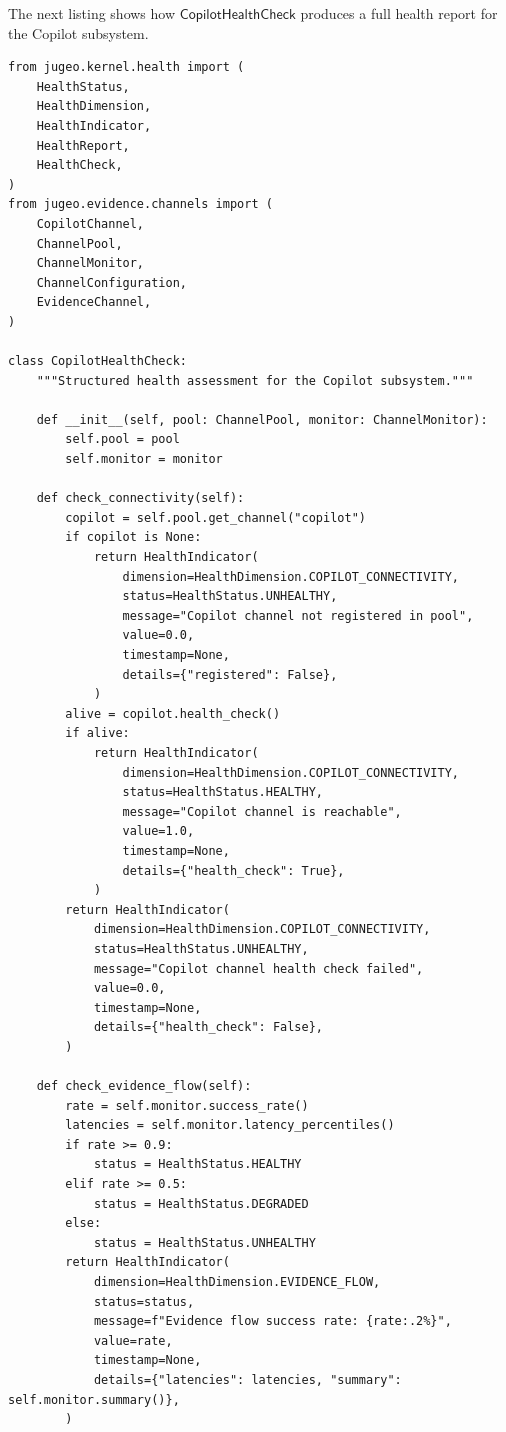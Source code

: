 \documentclass[11pt]{article}
\newcommand{\HealthChk}{\mathsf{CopilotHealthCheck}}
\begin{document}
The next listing shows how $\HealthChk$ produces a
full health report for the Copilot subsystem.

\begin{lstlisting}[style=jugeo-python,
  caption={Copilot health check producing HealthReport},
  label={lst:healthchk}]
from jugeo.kernel.health import (
    HealthStatus,
    HealthDimension,
    HealthIndicator,
    HealthReport,
    HealthCheck,
)
from jugeo.evidence.channels import (
    CopilotChannel,
    ChannelPool,
    ChannelMonitor,
    ChannelConfiguration,
    EvidenceChannel,
)

class CopilotHealthCheck:
    """Structured health assessment for the Copilot subsystem."""

    def __init__(self, pool: ChannelPool, monitor: ChannelMonitor):
        self.pool = pool
        self.monitor = monitor

    def check_connectivity(self):
        copilot = self.pool.get_channel("copilot")
        if copilot is None:
            return HealthIndicator(
                dimension=HealthDimension.COPILOT_CONNECTIVITY,
                status=HealthStatus.UNHEALTHY,
                message="Copilot channel not registered in pool",
                value=0.0,
                timestamp=None,
                details={"registered": False},
            )
        alive = copilot.health_check()
        if alive:
            return HealthIndicator(
                dimension=HealthDimension.COPILOT_CONNECTIVITY,
                status=HealthStatus.HEALTHY,
                message="Copilot channel is reachable",
                value=1.0,
                timestamp=None,
                details={"health_check": True},
            )
        return HealthIndicator(
            dimension=HealthDimension.COPILOT_CONNECTIVITY,
            status=HealthStatus.UNHEALTHY,
            message="Copilot channel health check failed",
            value=0.0,
            timestamp=None,
            details={"health_check": False},
        )

    def check_evidence_flow(self):
        rate = self.monitor.success_rate()
        latencies = self.monitor.latency_percentiles()
        if rate >= 0.9:
            status = HealthStatus.HEALTHY
        elif rate >= 0.5:
            status = HealthStatus.DEGRADED
        else:
            status = HealthStatus.UNHEALTHY
        return HealthIndicator(
            dimension=HealthDimension.EVIDENCE_FLOW,
            status=status,
            message=f"Evidence flow success rate: {rate:.2%}",
            value=rate,
            timestamp=None,
            details={"latencies": latencies, "summary": self.monitor.summary()},
        )


\end{lstlisting}
\end{document}
